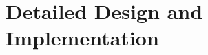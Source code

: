 \documentclass[report.tex]{subfiles}
\begin{document}
\chapter{Detailed Design and Implementation} %
\label{cha:detailed_design_and_implementation}

\newpage
\end{document}
